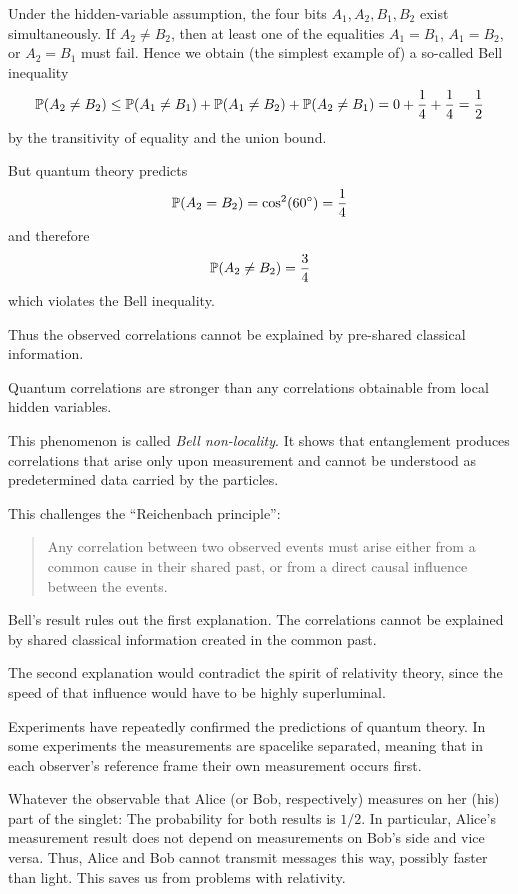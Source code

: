 Under the hidden-variable assumption, the four bits $A_1,A_2,B_1,B_2$ exist simultaneously.  
If $A_2\neq B_2$, then at least one of the equalities
$A_1=B_1$, $A_1=B_2$, or $A_2=B_1$
must fail.
Hence we obtain (the simplest example of) a so-called Bell inequality
\[
\operatorname{\mathbb{P}}(A_2 \neq B_2)
\leq
\operatorname{\mathbb{P}}(A_1 \neq B_1) + \operatorname{\mathbb{P}}(A_1 \neq B_2) + \operatorname{\mathbb{P}}(A_2 \neq B_1)
=
0 + \frac{1}{4} + \frac{1}{4}
=
\frac{1}{2}
\]
by the transitivity of equality and the union bound.

But quantum theory predicts
\[
\operatorname{\mathbb{P}}(A_2=B_2)=\cos^2(60^\circ)=\frac14
\]
and therefore
\[
\operatorname{\mathbb{P}}(A_2\neq B_2)=\frac34
\]
which violates the Bell inequality.

Thus the observed correlations cannot be explained by pre-shared classical information.

Quantum correlations are stronger than any correlations obtainable from local hidden variables.

This phenomenon is called \emph{Bell non-locality}.
It shows that entanglement produces correlations that arise only upon measurement and cannot be understood as predetermined data carried by the particles.







This challenges the ``Reichenbach principle'':
\begin{quote}
Any correlation between two observed events must arise either from a common cause in their shared past, or from a direct causal influence between the events.
\end{quote}

Bell's result rules out the first explanation.
The correlations cannot be explained by shared classical information created in the common past.

The second explanation would contradict the spirit of relativity theory, since the speed of that influence would have to be highly superluminal.

Experiments have repeatedly confirmed the predictions of quantum theory.
In some experiments the measurements are spacelike separated, meaning that in each observer's reference frame their own measurement occurs first.


\begin{remark}[No Signalling]
Whatever the observable that Alice (or Bob, respectively) measures on her (his) part of the singlet: 
The probability for both results is $1/2$. 
In particular, Alice's measurement result does not depend on measurements on Bob's side and vice versa. 
Thus, Alice and Bob cannot transmit messages this way, possibly faster than light. 
This saves us from problems with relativity.
\end{remark}

